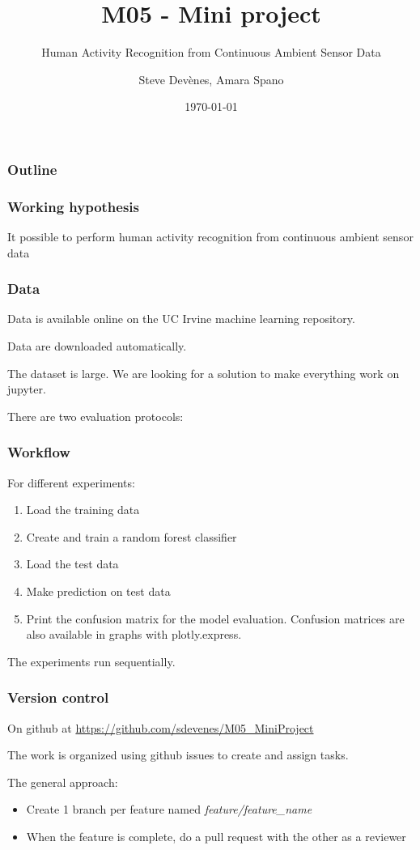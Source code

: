 \documentclass{beamer}
\title{M05 - Mini project}
\subtitle{Human Activity Recognition from Continuous Ambient Sensor Data}
\author{Steve Devènes, Amara Spano}
\institute{Unidistance}
\date{\today}
\begin{document}
	
	\begin{frame}
		\titlepage
	\end{frame}
	
	\begin{frame}
		\frametitle{Outline}
		\tableofcontents
	\end{frame}


	\begin{frame}
		\frametitle{Working hypothesis}
		It possible to perform human activity recognition from continuous ambient sensor data
	\end{frame}

	\begin{frame}
		\frametitle{Data}
		Data is available online on the UC Irvine machine learning repository.
		
		Data are downloaded automatically.
		
		The dataset is large. We are looking for a solution to make everything work on jupyter.
		
		There are two evaluation protocols:
		\begin{figure}
			\centering
		\end{figure}
	\end{frame}

	\begin{frame}
		\frametitle{Workflow}
		For different experiments:
		\begin{enumerate}
			\item Load the training data
			\item Create and train a random forest classifier
			\item Load the test data
			\item Make prediction on test data
			\item Print the confusion matrix for the model evaluation. Confusion matrices are also available in graphs with plotly.express.
		\end{enumerate}
	
		The experiments run sequentially.
	\end{frame}

	\begin{frame}
		\frametitle{Version control}
		On github at \url{https://github.com/sdevenes/M05_MiniProject}
		
		The work is organized using github issues to create and assign tasks.
		
		The general approach:
		\begin{itemize}
			\item Create 1 branch per feature named \textit{feature/feature\_name}
			\item When the feature is complete, do a pull request with the other as a reviewer
		\end{itemize}
	\end{frame}
\end{document}
